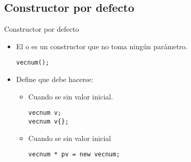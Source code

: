 \subsection{Constructor por defecto}

\begin{frame}[t,fragile]{Constructor por defecto}
\begin{itemize}
  \item El  o  
        es un constructor que no toma ningún parámetro.
\begin{lstlisting}
vecnum();
\end{lstlisting}

  \item Define que debe hacerse:
    \begin{itemize}
      \item Cuando se  sin valor inicial.
\begin{lstlisting}
vecnum v;
vecnum v{};
\end{lstlisting}

      \item Cuando se  sin valor inicial
\begin{lstlisting}
vecnum * pv = new vecnum;
\end{lstlisting}

    \end{itemize}
\end{itemize}
\end{frame}

